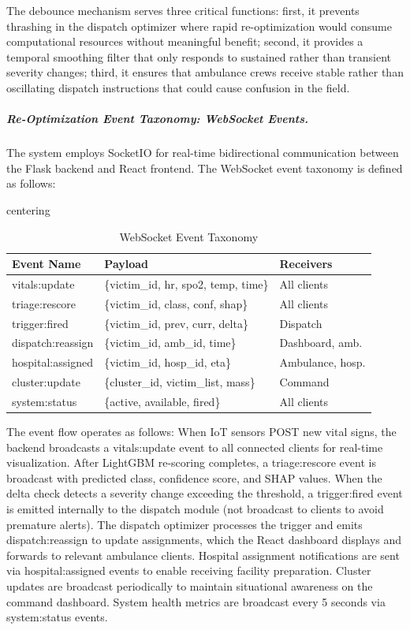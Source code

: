 \documentclass[conference]{IEEEtran}
\begin{document}
The debounce mechanism serves three critical functions: first, it prevents thrashing in the dispatch optimizer where rapid re-optimization would consume computational resources without meaningful benefit; second, it provides a temporal smoothing filter that only responds to sustained rather than transient severity changes; third, it ensures that ambulance crews receive stable rather than oscillating dispatch instructions that could cause confusion in the field.

\subparagraph{Re-Optimization Event Taxonomy: WebSocket Events.}
The system employs SocketIO for real-time bidirectional communication between the Flask backend and React frontend. The WebSocket event taxonomy is defined as follows:

\begin{table}[t]
\caption{WebSocket Event Taxonomy}
\label{tab:ws_events}
centering
\begin{tabularx}{\linewidth}{|l|l|X|}
\hline
\textbf{Event Name} & \textbf{Payload} & \textbf{Receivers} \\
\hline
vitals:update & \{victim\_id, hr, spo2, temp, time\} & All clients \\
triage:rescore & \{victim\_id, class, conf, shap\} & All clients \\
trigger:fired & \{victim\_id, prev, curr, delta\} & Dispatch \\
dispatch:reassign & \{victim\_id, amb\_id, time\} & Dashboard, amb. \\
hospital:assigned & \{victim\_id, hosp\_id, eta\} & Ambulance, hosp. \\
cluster:update & \{cluster\_id, victim\_list, mass\} & Command \\
system:status & \{active, available, fired\} & All clients \\
\hline
\end{tabularx}
\end{table}

The event flow operates as follows: When IoT sensors POST new vital signs, the backend broadcasts a vitals:update event to all connected clients for real-time visualization. After LightGBM re-scoring completes, a triage:rescore event is broadcast with predicted class, confidence score, and SHAP values. When the delta check detects a severity change exceeding the threshold, a trigger:fired event is emitted internally to the dispatch module (not broadcast to clients to avoid premature alerts). The dispatch optimizer processes the trigger and emits dispatch:reassign to update assignments, which the React dashboard displays and forwards to relevant ambulance clients. Hospital assignment notifications are sent via hospital:assigned events to enable receiving facility preparation. Cluster updates are broadcast periodically to maintain situational awareness on the command dashboard. System health metrics are broadcast every 5 seconds via system:status events.
\end{document}
